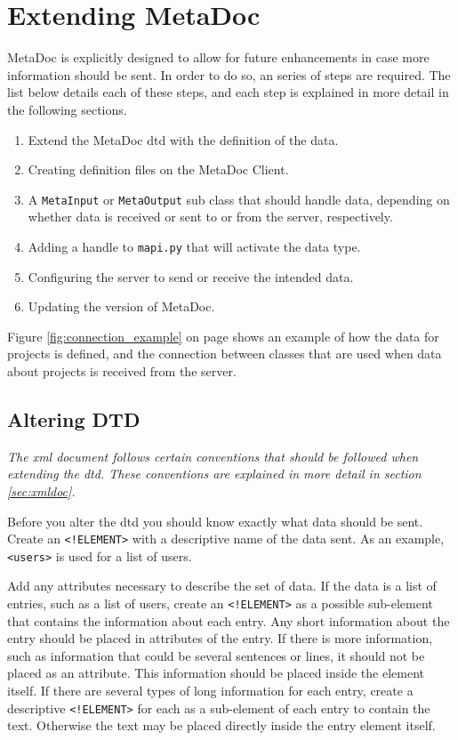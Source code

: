 \newpage
\section{Extending MetaDoc}
\label{sec:extending}
MetaDoc is explicitly designed to allow for future enhancements in case more
information should be sent. In order to do so, an series of steps are required.
The list below details each of these steps, and each step is explained in more
detail in the following sections.

\begin{enumerate}
    \item
        Extend the MetaDoc \gls{dtd} with the definition of the data.
    \item
        Creating definition files on the MetaDoc Client.
    \item
        A \texttt{MetaInput} or \texttt{MetaOutput} sub class that should
        handle data, depending on whether data is received or sent to or from
        the server, respectively.
    \item
        Adding a handle to \texttt{mapi.py} that will activate the data type.
    \item
        Configuring the server to send or receive the intended data.
    \item
        Updating the version of MetaDoc.
\end{enumerate}

Figure \ref{fig:connection_example} on page \pageref{fig:connection_example}
shows an example of how the data for projects is defined, and the connection
between classes that are used when data about projects is received from the
server.


\subsection{Altering DTD}
\textit{The \gls{xml} document follows certain conventions that should be
followed when extending the \gls{dtd}. These conventions are explained in more
detail in section \ref{sec:xmldoc}.}

Before you alter the \gls{dtd} you should know exactly what data should be
sent.  Create an \texttt{<!ELEMENT>} with a descriptive name of the data sent.
As an example, \texttt{<users>} is used for a list of users. 

Add any attributes necessary to describe the set of data. If the data is a list
of entries, such as a list of users, create an \texttt{<!ELEMENT>} as a
possible sub-element that contains the information about each entry. Any short
information about the entry should be placed in attributes of the entry. If
there is more information, such as information that could be several sentences
or lines, it should not be placed as an attribute. This information should be
placed inside the element itself. If there are several types of long
information for each entry, create a descriptive \texttt{<!ELEMENT>} for each
as a sub-element of each entry to contain the text. Otherwise the text may be
placed directly inside the entry element itself. 

